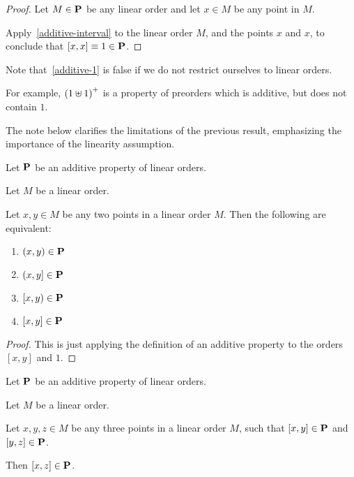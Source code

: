 \begin{proof}
  Let $M \in \mathbf{P}$ be any linear order and let
  $x \in M$ be any point in $M$.

  Apply~\cref{additive-interval} to the linear order $M$,
  and the points $x$ and $x$, to conclude that
  $[x, x] \equiv 1 \in \mathbf{P}$.
\end{proof}

\begin{note}
  Note that~\cref{additive-1} is false if we do not restrict ourselves to linear orders.

  For example, $\left( {1 \uplus 1} \right)^+$ is a property of preorders
  which is additive, but does not contain $1$.
\end{note}

The note below clarifies the limitations of the previous result, emphasizing the importance of the linearity assumption.

\begin{corollary}\label{additive-endpoints}
  Let $\mathbf{P}$ be an additive property of linear orders.

  Let $M$ be a linear order.

  Let $x, y \in M$ be any two points in a linear order $M$.
  Then the following are equivalent:

  \begin{enumerate}
    \item $(x, y) \in \mathbf{P}$
    \item $(x, y] \in \mathbf{P}$
    \item $[x, y) \in \mathbf{P}$
    \item $[x, y] \in \mathbf{P}$
  \end{enumerate}
\end{corollary}

\begin{proof}
  This is just applying the definition of an additive property
  to the orders $[x, y]$ and $1$.
\end{proof}

\begin{corollary}\label{additive-transitivity}
  Let $\mathbf{P}$ be an additive property of linear orders.

  Let $M$ be a linear order.

  Let $x, y, z \in M$ be any three points in a linear order $M$,
  such that $[x, y] \in \mathbf{P}$ and $[y, z] \in \mathbf{P}$.

  Then $[x, z] \in \mathbf{P}$.
\end{corollary}

